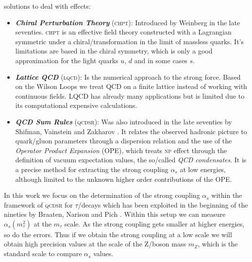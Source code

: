\documentclass[../../index.tex]{subfiles}
\begin{document}
solutions to deal with  effects:
\begin{itemize}
\item \textbf{\textit{Chiral Perturbation Theory}}
  (\textsc{chpt}):
  Introduced by Weinberg \cite{Weinberg1978} in the late seventies.
  \textsc{chpt} is an effective field theory constructed with a Lagrangian
  symmetric under a chiral\-/transformation in the limit of massless quarks.
  It's limitations are based in the chiral symmetry, which is only a good
  approximation for the light quarks $u$, $d$ and in some cases $s$.
\item \textbf{\textit{Lattice QCD}}
  (\textsc{lqcd}):
  Is the numerical approach to the strong force. Based on the Wilson Loops
  \cite{Wilson1974} we treat QCD on a finite lattice instead of working with
  continuous fields. LQCD has already many applications but is limited due to
  its computational expensive calculations.
\item \textbf{\textit{QCD Sum Rules}}
  (\textsc{qcdsr}): Was also introduced in the late seventies by Shifman, Vainstein and
  Zakharov \cite{Shifman1978,Shifman1978a}. It relates the observed hadronic
  picture to quark\-/gluon parameters through a dispersion relation and the use
  of the \textit{Operator Product Expansion} (OPE), which treats \textsc{np}
  effect through the definition of vacuum expectation values, the so\-/called
  \textit{QCD condensates}. It is a precise method for extracting the strong
  coupling $\alpha_s$ at low energies, although limited to the unknown higher
  order contributions of the OPE.
\end{itemize}


In this work we focus on the determination of the strong coupling $\alpha_s$
within the framework of \textsc{qcdsr} for $\tau$\-/decays which has been
exploited in the beginning of the nineties by Braaten, Narison and Pich
\cite{Braaten1991}. Within this setup we can measure $\alpha_s(m_\tau^2)$ at the
$m_\tau$ scale. As the strong coupling gets smaller at higher energies, so do
the errors. Thus if we obtain the strong coupling at a low scale we will obtain
high precision values at the scale of the Z\-/boson mass $m_Z$, which is the
standard scale to compare $\alpha_s$ values.
\end{document}
